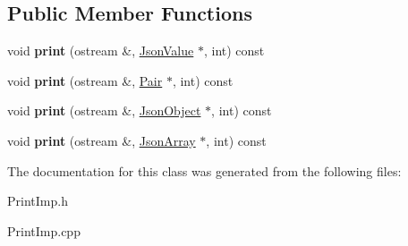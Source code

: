 \subsection*{Public Member Functions}
\begin{DoxyCompactItemize}
\item 
\hypertarget{class_default_print_imp_a3c5e2fe3de894a4a73e80c32c9c635f6}{void {\bfseries print} (ostream \&, \hyperlink{class_json_value}{Json\-Value} $\ast$, int) const }\label{class_default_print_imp_a3c5e2fe3de894a4a73e80c32c9c635f6}

\item 
\hypertarget{class_default_print_imp_ae0e286005fccd96db0fa89284f981581}{void {\bfseries print} (ostream \&, \hyperlink{class_pair}{Pair} $\ast$, int) const }\label{class_default_print_imp_ae0e286005fccd96db0fa89284f981581}

\item 
\hypertarget{class_default_print_imp_ae298ea68db9a0ec325842debb3d47ee6}{void {\bfseries print} (ostream \&, \hyperlink{class_json_object}{Json\-Object} $\ast$, int) const }\label{class_default_print_imp_ae298ea68db9a0ec325842debb3d47ee6}

\item 
\hypertarget{class_default_print_imp_a568dfb4baf46d29ddb0b3f894a08e7e2}{void {\bfseries print} (ostream \&, \hyperlink{class_json_array}{Json\-Array} $\ast$, int) const }\label{class_default_print_imp_a568dfb4baf46d29ddb0b3f894a08e7e2}

\end{DoxyCompactItemize}


The documentation for this class was generated from the following files\-:\begin{DoxyCompactItemize}
\item 
Print\-Imp.\-h\item 
Print\-Imp.\-cpp\end{DoxyCompactItemize}

